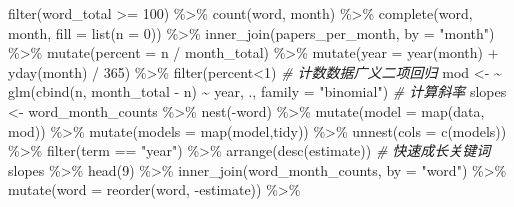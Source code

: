 \documentclass[]{tufte-book}
\newenvironment{Shaded}{}{}
\newcommand{\AttributeTok}[1]{\textcolor[rgb]{0.49,0.56,0.16}{#1}}
\newcommand{\CommentTok}[1]{\textcolor[rgb]{0.38,0.63,0.69}{\textit{#1}}}
\newcommand{\DecValTok}[1]{\textcolor[rgb]{0.25,0.63,0.44}{#1}}
\newcommand{\ErrorTok}[1]{\textcolor[rgb]{1.00,0.00,0.00}{\textbf{#1}}}
\newcommand{\FunctionTok}[1]{\textcolor[rgb]{0.02,0.16,0.49}{#1}}
\newcommand{\NormalTok}[1]{#1}
\newcommand{\OtherTok}[1]{\textcolor[rgb]{0.00,0.44,0.13}{#1}}
\newcommand{\SpecialCharTok}[1]{\textcolor[rgb]{0.25,0.44,0.63}{#1}}
\newcommand{\StringTok}[1]{\textcolor[rgb]{0.25,0.44,0.63}{#1}}
\begin{document}
\begin{Shaded}
\begin{Highlighting}[]
  \FunctionTok{filter}\NormalTok{(word\_total }\SpecialCharTok{\textgreater{}=} \DecValTok{100}\NormalTok{) }\SpecialCharTok{\%\textgreater{}\%}
  \FunctionTok{count}\NormalTok{(word, month) }\SpecialCharTok{\%\textgreater{}\%}
  \FunctionTok{complete}\NormalTok{(word, month, }\AttributeTok{fill =} \FunctionTok{list}\NormalTok{(}\AttributeTok{n =} \DecValTok{0}\NormalTok{)) }\SpecialCharTok{\%\textgreater{}\%}
  \FunctionTok{inner\_join}\NormalTok{(papers\_per\_month, }\AttributeTok{by =} \StringTok{"month"}\NormalTok{) }\SpecialCharTok{\%\textgreater{}\%}
  \FunctionTok{mutate}\NormalTok{(}\AttributeTok{percent =}\NormalTok{ n }\SpecialCharTok{/}\NormalTok{ month\_total) }\SpecialCharTok{\%\textgreater{}\%}
  \FunctionTok{mutate}\NormalTok{(}\AttributeTok{year =} \FunctionTok{year}\NormalTok{(month) }\SpecialCharTok{+} \FunctionTok{yday}\NormalTok{(month) }\SpecialCharTok{/} \DecValTok{365}\NormalTok{) }\SpecialCharTok{\%\textgreater{}\%}
        \FunctionTok{filter}\NormalTok{(percent}\SpecialCharTok{\textless{}}\DecValTok{1}\NormalTok{)}
\CommentTok{\# 计数数据广义二项回归}
\NormalTok{mod }\OtherTok{\textless{}{-}} \ErrorTok{\textasciitilde{}} \FunctionTok{glm}\NormalTok{(}\FunctionTok{cbind}\NormalTok{(n, month\_total }\SpecialCharTok{{-}}\NormalTok{ n) }\SpecialCharTok{\textasciitilde{}}\NormalTok{ year, ., }\AttributeTok{family =} \StringTok{"binomial"}\NormalTok{)}
\CommentTok{\# 计算斜率}
\NormalTok{slopes }\OtherTok{\textless{}{-}}\NormalTok{ word\_month\_counts }\SpecialCharTok{\%\textgreater{}\%}
  \FunctionTok{nest}\NormalTok{(}\SpecialCharTok{{-}}\NormalTok{word) }\SpecialCharTok{\%\textgreater{}\%}
  \FunctionTok{mutate}\NormalTok{(}\AttributeTok{model =} \FunctionTok{map}\NormalTok{(data, mod)) }\SpecialCharTok{\%\textgreater{}\%}
  \FunctionTok{mutate}\NormalTok{(}\AttributeTok{models =} \FunctionTok{map}\NormalTok{(model,tidy)) }\SpecialCharTok{\%\textgreater{}\%}
  \FunctionTok{unnest}\NormalTok{(}\AttributeTok{cols =} \FunctionTok{c}\NormalTok{(models)) }\SpecialCharTok{\%\textgreater{}\%}
  \FunctionTok{filter}\NormalTok{(term }\SpecialCharTok{==} \StringTok{"year"}\NormalTok{) }\SpecialCharTok{\%\textgreater{}\%}
  \FunctionTok{arrange}\NormalTok{(}\FunctionTok{desc}\NormalTok{(estimate))}
\CommentTok{\# 快速成长关键词}
\NormalTok{slopes }\SpecialCharTok{\%\textgreater{}\%}
  \FunctionTok{head}\NormalTok{(}\DecValTok{9}\NormalTok{) }\SpecialCharTok{\%\textgreater{}\%}
  \FunctionTok{inner\_join}\NormalTok{(word\_month\_counts, }\AttributeTok{by =} \StringTok{"word"}\NormalTok{) }\SpecialCharTok{\%\textgreater{}\%}
  \FunctionTok{mutate}\NormalTok{(}\AttributeTok{word =} \FunctionTok{reorder}\NormalTok{(word, }\SpecialCharTok{{-}}\NormalTok{estimate)) }\SpecialCharTok{\%\textgreater{}\%}

\end{Highlighting}
\end{Shaded}
\end{document}

